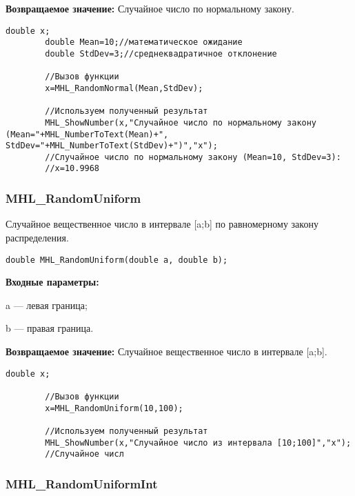 \documentclass[a4paper,12pt]{article}
\begin{document}
\textbf{Возвращаемое значение:}
Случайное число по нормальному закону.


\begin{lstlisting}[label=code_use_MHL_RandomNormal,caption=Пример использования]
        double x;
        double Mean=10;//математическое ожидание
        double StdDev=3;//среднеквадратичное отклонение

        //Вызов функции
        x=MHL_RandomNormal(Mean,StdDev);

        //Используем полученный результат
        MHL_ShowNumber(x,"Случайное число по нормальному закону (Mean="+MHL_NumberToText(Mean)+", StdDev="+MHL_NumberToText(StdDev)+")","x");
        //Случайное число по нормальному закону (Mean=10, StdDev=3):
        //x=10.9968
\end{lstlisting}

\subsubsection{MHL\_RandomUniform}\label{MHL_RandomUniform}

Случайное вещественное число в интервале [a;b] по равномерному закону распределения.


\begin{lstlisting}[label=code_syntax_MHL_RandomUniform,caption=Синтаксис]
double MHL_RandomUniform(double a, double b);
\end{lstlisting}

\textbf{Входные параметры:}

 a --- левая граница;
  
 b --- правая граница.

\textbf{Возвращаемое значение:}
Случайное вещественное число в интервале [a;b].


\begin{lstlisting}[label=code_use_MHL_RandomUniform,caption=Пример использования]
        double x;

        //Вызов функции
        x=MHL_RandomUniform(10,100);

        //Используем полученный результат
        MHL_ShowNumber(x,"Случайное число из интервала [10;100]","x");
        //Случайное числ
\end{lstlisting}

\subsubsection{MHL\_RandomUniformInt}\label{MHL_RandomUniformInt}
\end{document}

